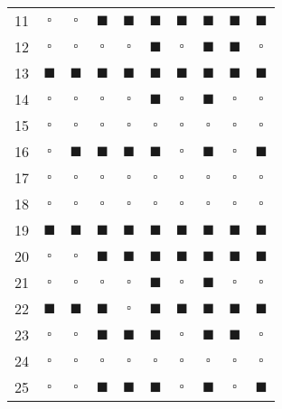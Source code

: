 \begin{table}
\begin{tabular}[t]{c | c | c | c | c | c | c | c | c | c}
			11 & $\square$ & $\square$ & $\blacksquare$ & $\blacksquare$ & $\blacksquare$ & $\blacksquare$ & $\blacksquare$ & $\blacksquare$ & $\blacksquare$ \\
			12 & $\square$ & $\square$ & $\square$ & $\square$ & $\blacksquare$ & $\square$ & $\blacksquare$ & $\blacksquare$ & $\square$  \\
			13 & $\blacksquare$ & $\blacksquare$ & $\blacksquare$ & $\blacksquare$ & $\blacksquare$ & $\blacksquare$ & $\blacksquare$ & $\blacksquare$ & $\blacksquare$ \\
			14 & $\square$ & $\square$ & $\square$ & $\square$ & $\blacksquare$ & $\square$ & $\blacksquare$ & $\square$ & $\square$  \\
			15 & $\square$ & $\square$ & $\square$ & $\square$ & $\square$ & $\square$ & $\square$ & $\square$ & $\square$ \\
			16 & $\square$ & $\blacksquare$ & $\blacksquare$ & $\blacksquare$ & $\blacksquare$ & $\square$ & $\blacksquare$ & $\square$ & $\blacksquare$ \\
			17 & $\square$ & $\square$ & $\square$ & $\square$ & $\square$ & $\square$ & $\square$ & $\square$ & $\square$ \\
			18 & $\square$ & $\square$ & $\square$ & $\square$ & $\square$ & $\square$ & $\square$ & $\square$ & $\square$ \\
			19 & $\blacksquare$ & $\blacksquare$ & $\blacksquare$ & $\blacksquare$ & $\blacksquare$ & $\blacksquare$ & $\blacksquare$ & $\blacksquare$ & $\blacksquare$\\
			20 & $\square$ & $\square$ & $\blacksquare$ & $\blacksquare$ & $\blacksquare$ & $\blacksquare$ & $\blacksquare$ & $\blacksquare$ & $\blacksquare$ \\
			21 & $\square$ & $\square$ & $\square$ & $\square$ & $\blacksquare$ & $\square$ & $\blacksquare$ & $\square$ & $\square$ \\
			22 & $\blacksquare$ & $\blacksquare$ & $\blacksquare$ & $\square$ & $\blacksquare$ & $\blacksquare$ & $\blacksquare$ & $\blacksquare$ & $\blacksquare$ \\
			23 & $\square$ & $\square$ & $\blacksquare$ & $\blacksquare$ & $\blacksquare$ & $\square$ & $\blacksquare$ & $\blacksquare$ & $\square$ \\
			24 & $\square$ & $\square$ & $\square$ & $\square$ & $\square$ & $\square$ & $\square$ & $\square$ & $\square$ \\
			25 & $\square$ & $\square$ & $\blacksquare$ & $\blacksquare$ & $\blacksquare$ & $\square$ & $\blacksquare$ & $\square$ & $\blacksquare$ \\

\end{tabular}
\end{table}
